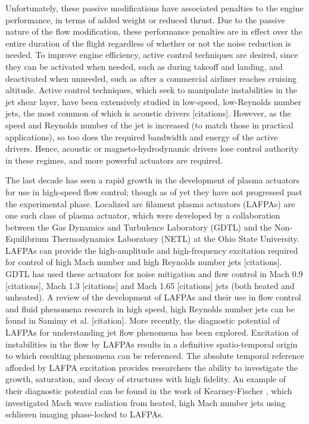 Unfortunately, these passive modifications have associated penalties to the engine performance, in terms of added weight or reduced thrust.
Due to the passive nature of the flow modification, these performance penalties are in effect over the entire duration of the flight regardless of whether or not the noise reduction is needed. 
To improve engine efficiency, active control techniques are desired, since they can be activated when needed, such as during takeoff and landing, and deactivated when unneeded, such as after a commercial airliner reaches cruising altitude. 
Active control techniques, which seek to manipulate instabilities in the jet shear layer, have been extensively studied in low-speed, low-Reynolds number jets, the most common of which is acoustic drivers [citations]. 
However, as the speed and Reynolds number of the jet is increased (to match those in practical applications), so too does the required bandwidth and energy of the active drivers. 
Hence, acoustic or magneto-hydrodynamic drivers lose control authority in these regimes, and more powerful actuators are required.

The last decade has seen a rapid growth in the development of plasma actuators for use in high-speed flow control; though as of yet they have not progressed past the experimental phase.
Localized arc filament plasma actuators (LAFPAs) are one such class of plasma actuator, which were developed by a collaboration between the Gas Dynamics and Turbulence Laboratory (GDTL) and the Non-Equilibrium Thermodynamics Laboratory (NETL) at the Ohio State University.
LAFPAs can provide the high-amplitude and high-frequency excitation required for control of high Mach number and high Reynolds number jets [citations]. 
GDTL has used these actuators for noise mitigation and flow control in Mach 0.9 [citations], Mach 1.3 [citations] and Mach 1.65 [citations] jets (both heated and unheated). 
A review of the development of LAFPAs and their use in flow control and fluid phenomena research in high speed, high Reynolds number jets can be found in Samimy et al. [citation]. 
More recently, the diagnostic potential of LAFPAs for understanding jet flow phenomena has been explored. Excitation of instabilities in the flow by LAFPAs results in a definitive spatio-temporal origin to which resulting phenomena can be referenced. 
The absolute temporal reference afforded by LAFPA excitation provides researchers the ability to investigate the growth, saturation, and decay of structures with high fidelity. 
An example of their diagnostic potential can be found in the work of Kearney-Fischer \etal [citation], which investigated Mach wave radiation from heated, high Mach number jets using schlieren imaging phase-locked to LAFPAs. 

